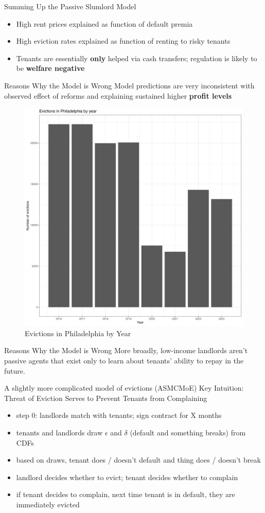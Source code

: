 \documentclass[10pt, xcolor=dvipsnames]{beamer}
\begin{document}
\begin{frame}{Summing Up the Passive Slumlord Model}
\begin{itemize}
    \item High rent prices explained as function of default premia 
    \item High eviction rates explained as function of renting to risky tenants
    \item Tenants are essentially \textbf{only} helped via cash transfers; regulation is likely to be \textbf{welfare negative}
\end{itemize}
    
\end{frame}

\begin{frame}{Reasons Why the Model is Wrong}
    Model predictions are very inconsistent with observed effect of reforms and explaining sustained higher \textbf{profit levels}
    \begin{figure}
    \centering
    \includegraphics[width=0.5\linewidth]{figs/evict_by_year.png}
    \caption{Evictions in Philadelphia by Year}
    \label{fig:philly-ts}
\end{figure}
\end{frame}

\begin{frame}{Reasons Why the Model is Wrong}
    More broadly, low-income landlords aren't passive agents that exist only to learn about tenants' ability to repay in the future.\\
\end{frame}

\begin{frame}{A slightly more complicated model of evictions (ASMCMoE)}
Key Intuition: Threat of Eviction Serves to Prevent Tenants from Complaining
\begin{itemize}
    \item step 0: landlords match with tenants; sign contract for X months
    \item tenants and landlords draw $\epsilon$ and $\delta$ (default and something breaks) from CDFs
    \item based on draws, tenant does / doesn't default and thing does / doesn't break
    \item landlord decides whether to evict; tenant decides whether to complain
    \item if tenant decides to complain, next time tenant is in default, they are immediately evicted
\end{itemize}
\end{frame}
\end{document}
